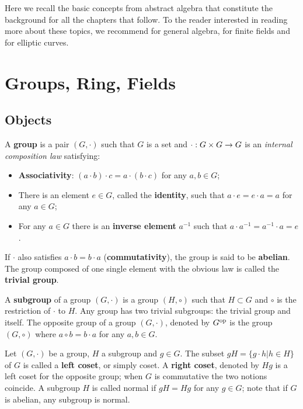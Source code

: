 Here we recall the basic concepts from abstract algebra that
constitute the background for all the chapters that follow. To the
reader interested in reading more about these topics, we recommend
\cite{lang} for general algebra, \cite{lidl+niederreiter:2} for finite
fields and \cite{silverman:elliptic,silverman:advanced} for elliptic
curves.

\section{Groups, Ring, Fields}
\label{sec:ring-fields}

\subsection{Objects}
\label{sec:ring-fields:objects}

A \textbf{group} is a pair $(G,\cdot)$ such that $G$ is a
set and $\cdot:G\times G\rightarrow G$ is an \emph{internal composition law}
satisfying:
\begin{itemize}
\item {}\textbf{Associativity}: $(a\cdot b)\cdot c
  = a \cdot (b\cdot c)$ for any $a,b\in G$;
\item There is an element $e\in G$, called the
  \textbf{identity}, such that $a\cdot e =
  e\cdot a = a$ for any $a\in G$;
\item For any $a\in G$ there is an
  \textbf{inverse element} $a^{-1}$ such that
  $a\cdot a^{-1} = a^{-1}\cdot a = e$.
\end{itemize}
If $\cdot$ also satisfies $a\cdot b=b\cdot a$
(\textbf{commutativity}), the group is said to be
\textbf{abelian}. The group composed of one
single element with the obvious law is called the
\textbf{trivial group}.

A \textbf{subgroup} of a group $(G,\cdot)$ is a group
$(H,\circ)$ such that $H\subset G$ and $\circ$ is the restriction of
$\cdot$ to $H$. Any group has two trivial subgroups: the trivial group
and itself. The 
opposite group of a group $(G,\cdot)$,
denoted by $G^{\mathrm{op}}$ is the group $(G,\circ)$ where $a\circ b=b\cdot a$
for any $a,b\in G$.

Let $(G,\cdot)$ be a group, $H$ a subgroup and $g\in G$. The subset
$gH = \{g\cdot h | h \in H \}$ of $G$ is called a
\textbf{left coset}, or simply
coset. A \textbf{right coset},
denoted by $Hg$ is a left coset for the opposite group; when $G$ is
commutative the two notions coincide. A subgroup $H$ is called
normal if $gH=Hg$ for any $g\in G$; note that
if $G$ is abelian, any subgroup is normal.

